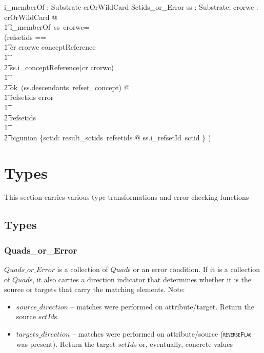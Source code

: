 \documentclass{article}
\def\spec#1{{\tt \small \textsc{{#1}} }}
\begin{document}
\begin{gendef}
   i\_memberOf : Substrate \fun crOrWildCard \fun Sctids\_or\_Error 
\where
   \forall ss : Substrate; crorwc : crOrWildCard @ \\
   \t1 i\_memberOf~ss~crorwc= \\
(\LET refsetids == \\
\t1 \IF cr \inv crorwc \in conceptReference \\
\t1 \THEN \\
\t2 ss.i\_conceptReference(cr \inv crorwc) \\
\t1 \ELSE \\
\t2 ok~(ss.descendants~refset\_concept) @ \\
\t1 \IF refsetids \in \ran error \\
\t1 \THEN \\
\t2 refsetids \\
\t1 \ELSE \\
\t2 bigunion \{sctid: result\_sctids~refsetids @ ss.i\_refsetId~sctid \} )
\end{gendef}

\pagebreak

\section{Types}
This section carries various type transformations and error checking functions

\subsection{Types}

\subsubsection{Quads\_or\_Error}
$Quads\_or\_Error$ is a collection of $Quad$s or an error condition.  If it is a collection of $Quad$s, it also carries a direction indicator that determines
whether it is the source or targets that carry the matching elements.   Note:
\begin{itemize}[noitemsep,nolistsep]
\item \textbf{$source\_direction$} -- matches were performed on attribute/target. Return the source $sctId$s.
\item \textbf{$targets\_direction$} -- matches were performed on attribute/source (\spec{reverseFlag} was present).  Return the target $sctId$s or, eventually, concrete values
\end{itemize}
\end{document}
